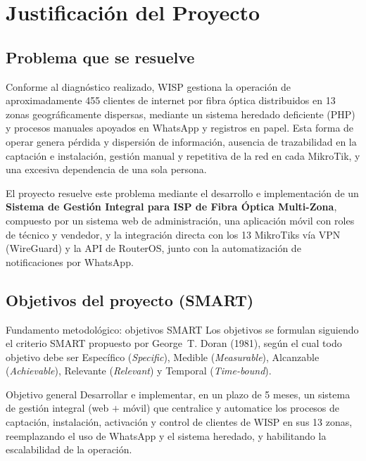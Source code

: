 \section{Justificación del Proyecto}
\label{sec:justificacion}

\subsection{Problema que se resuelve}

Conforme al diagnóstico realizado, WISP gestiona la operación de aproximadamente
455 clientes de internet por fibra óptica distribuidos en 13 zonas geográficamente
dispersas, mediante un sistema heredado deficiente (PHP) y procesos manuales
apoyados en WhatsApp y registros en papel. Esta forma de operar genera pérdida y
dispersión de información, ausencia de trazabilidad en la captación e instalación,
gestión manual y repetitiva de la red en cada MikroTik, y una excesiva dependencia
de una sola persona.

El proyecto resuelve este problema mediante el desarrollo e implementación de un
\textbf{Sistema de Gestión Integral para ISP de Fibra Óptica Multi-Zona}, compuesto
por un sistema web de administración, una aplicación móvil con roles de técnico y
vendedor, y la integración directa con los 13 MikroTiks vía VPN (WireGuard) y la API
de RouterOS, junto con la automatización de notificaciones por WhatsApp.

\subsection{Objetivos del proyecto (SMART)}

\begin{upeubox}{Fundamento metodológico: objetivos SMART}
Los objetivos se formulan siguiendo el criterio SMART propuesto por George~T. Doran
(1981), según el cual todo objetivo debe ser Específico (\textit{Specific}), Medible
(\textit{Measurable}), Alcanzable (\textit{Achievable}), Relevante (\textit{Relevant})
y Temporal (\textit{Time-bound}).
\end{upeubox}

\begin{upeubox}{Objetivo general}
Desarrollar e implementar, en un plazo de 5 meses, un sistema de gestión integral
(web $+$ móvil) que centralice y automatice los procesos de captación, instalación,
activación y control de clientes de WISP en sus 13 zonas, reemplazando el uso de
WhatsApp y el sistema heredado, y habilitando la escalabilidad de la operación.
\end{upeubox}

